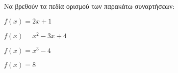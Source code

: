 Να βρεθούν τα πεδία ορισμού των παρακάτω συναρτήσεων:
\begin{alist}
\item $ f(x)=2x+1 $
\item $ f(x)=x^2-3x+4 $
\item $ f(x)=x^3-4 $
\item $ f(x)=8 $
\end{alist}

